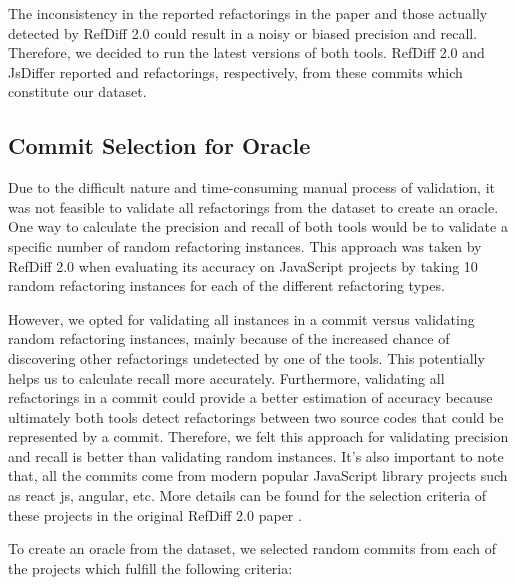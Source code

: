 \documentclass[letterpaper,12pt,onecolumn,final]{report}
\begin{document}
The inconsistency in the reported refactorings in the paper and those actually detected by RefDiff 2.0 could result in a noisy or biased precision and recall. Therefore, we decided to run the latest versions of both tools. RefDiff 2.0 and JsDiffer reported \evRefDiffToolTotalRefCount{} and \evJsDifferToolTotalRefCount{} refactorings, respectively, from these \evTotalCommits{} commits which constitute our dataset.

\subsection {Commit Selection for Oracle}
Due to the difficult nature and time-consuming manual process of validation, it was not feasible to validate all refactorings from the dataset to create an oracle. One way to calculate the precision and recall of both tools would be to validate a specific number of random refactoring instances. This approach was taken by RefDiff 2.0 when evaluating its accuracy on JavaScript projects by taking 10 random refactoring instances for each of the different refactoring types.

However, we opted for validating all instances in a commit versus validating random refactoring instances, mainly because of the increased chance of discovering other refactorings undetected by one of the tools. This potentially helps us to calculate recall more accurately. Furthermore, validating all refactorings in a commit could provide a better estimation of accuracy because ultimately both tools detect refactorings between two source codes that could be represented by a commit. Therefore, we felt this approach for validating precision and recall is better than validating random instances. It's also important to note that, all the commits come from modern popular JavaScript library projects such as react js, angular, etc. More details can be found for the selection criteria of these projects in the original RefDiff 2.0 paper \cite{Silva2016}.

To create an oracle from the dataset, we selected \evCompareRandomCommitCount{} random commits from each of the projects which fulfill the following criteria:
\end{document}
